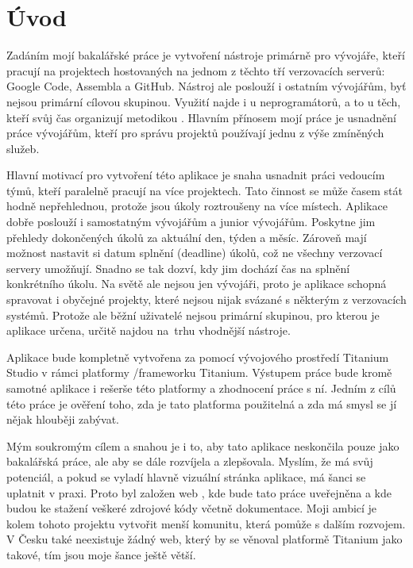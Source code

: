 \chapter{Úvod}

Zadáním mojí bakalářské práce je vytvoření nástroje primárně pro vývojáře, kteří pracují na projektech hostovaných na jednom z těchto tří verzovacích serverů: Google Code\cite{gcode}, Assembla\cite{assembla} a GitHub\cite{github}. Nástroj ale poslouží i ostatním vývojářům, byť nejsou primární cílovou skupinou. Využití najde i u neprogramátorů, a to u těch, kteří svůj čas organizují metodikou \cite{gtd:web}. Hlavním přínosem mojí práce je usnadnění práce vývojářům, kteří pro správu projektů používají jednu z výše zmíněných služeb. 

Hlavní motivací pro vytvoření této aplikace je snaha usnadnit práci vedoucím týmů, kteří paralelně pracují na více projektech. Tato činnost se může časem stát hodně nepřehlednou, protože jsou úkoly roztroušeny na více místech. Aplikace dobře poslouží i samostatným vývojářům a junior vývojářům. Poskytne jim přehledy dokončených úkolů za aktuální den, týden a měsíc. Zároveň mají možnost nastavit si datum splnění (deadline) úkolů, což ne všechny verzovací servery umožňují. Snadno se tak dozví, kdy jim dochází čas na splnění konkrétního úkolu. Na světě ale nejsou jen vývojáři, proto je aplikace schopná spravovat i obyčejné projekty, které nejsou nijak svázané s některým z verzovacích systémů. Protože ale běžní uživatelé nejsou primární skupinou, pro kterou je aplikace určena, určitě najdou na~trhu vhodnější nástroje.

Aplikace bude kompletně vytvořena za pomocí vývojového prostředí Titanium Studio\cite{titanium} v rámci platformy \slash frameworku Titanium. Výstupem práce bude kromě samotné aplikace i rešerše této platformy a zhodnocení práce s ní. Jedním z cílů této práce je ověření toho, zda je tato platforma použitelná a zda má smysl se jí nějak hlouběji zabývat.

Mým soukromým cílem a snahou je i to, aby tato aplikace neskončila pouze jako bakalářská práce, ale aby se dále rozvíjela a zlepšovala. Myslím, že má svůj potenciál, a pokud se vyladí hlavně vizuální stránka aplikace, má šanci se uplatnit v praxi. Proto byl založen web \cite{gtdtoolweb}, kde bude tato práce uveřejněna a kde budou ke stažení veškeré zdrojové kódy včetně dokumentace. Moji ambicí je kolem tohoto projektu vytvořit menší komunitu, která pomůže s dalším rozvojem. V Česku také neexistuje žádný web, který by se věnoval platformě Titanium jako takové, tím jsou moje šance ještě větší.